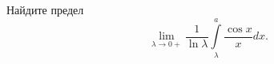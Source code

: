 \documentclass{article}
\begin{document}
Найдите предел
$$\lim\limits_{\lambda \to 0+} \frac{1}{\ln \lambda} \int\limits_\lambda^a \frac{\cos x}{x} dx.$$
\end{document}
